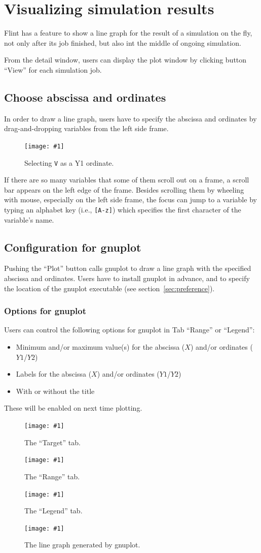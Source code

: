 \documentclass[a4paper,10pt]{report}
\newcommand\FigureOfImage[2]{\begin{figure}[h]
  \centering
  \texttt{[image: \#1]}
  \caption{#2}\label{fig:#1}
\end{figure}}
\begin{document}
\section{Visualizing simulation results}
Flint has a feature to show a line graph for the result of a simulation on the
fly, not only after its job finished, but also int the middle of ongoing
simulation.

From the detail window, users can display the plot window by clicking button
``View'' for each simulation job.

\subsection{Choose abscissa and ordinates}
In order to draw a line graph, users have to specify the abscissa and ordinates
by drag-and-dropping variables from the left side frame.
\FigureOfImage{lr-plot}{Selecting {\tt V} as a Y1 ordinate.}

If there are so many variables that some of them scroll out on a frame, a scroll
bar appears on the left edge of the frame. Besides scrolling them by wheeling
with mouse, especially on the left side frame, the focus can jump to a variable
by typing an alphabet key (i.e., \texttt{[A-z]}) which specifies the first
character of the variable's name.

\subsection{Configuration for gnuplot}
Pushing the ``Plot'' button calls gnuplot to draw a line graph with the
specified abscissa and ordinates. Users have to install gnuplot in advance, and
to specify the location of the gnuplot executable (see
section~\ref{sec:preference}).

\subsubsection{Options for gnuplot}
Users can control the following options for gnuplot in Tab ``Range'' or ``Legend'':
\begin{itemize}
\item Minimum and/or maximum value(s) for the abscissa ($X$) and/or ordinates ($Y1$/$Y2$)
\item Labels for the abscissa ($X$) and/or ordinates ($Y1$/$Y2$)
\item With or without the title
\end{itemize}
These will be enabled on next time plotting.
\FigureOfImage{lr-plot-target}{The ``Target'' tab.}
\FigureOfImage{lr-plot-range}{The ``Range'' tab.}
\FigureOfImage{lr-plot-legend}{The ``Legend'' tab.}
\FigureOfImage{lr-gnuplot}{The line graph generated by gnuplot.}
\end{document}
